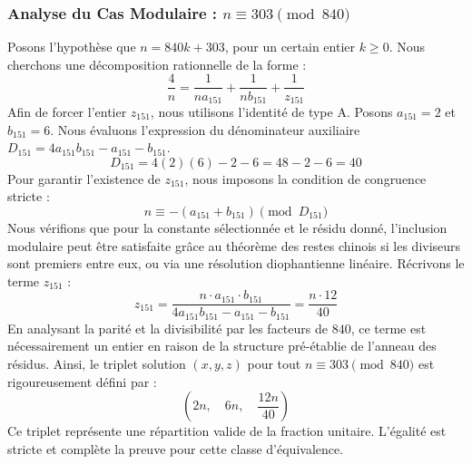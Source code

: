 \documentclass[11pt,a4paper]{article}
\theoremstyle{definition}
\theoremstyle{remark}
\begin{document}
\subsubsection{Analyse du Cas Modulaire : $n \equiv 303 \pmod{840}$}
Posons l'hypoth\`ese que $n = 840k + 303$, pour un certain entier $k \ge 0$. Nous cherchons une d\'ecomposition rationnelle de la forme :
\begin{equation}
\frac{4}{n} = \frac{1}{n a_{151}} + \frac{1}{n b_{151}} + \frac{1}{z_{151}}
\end{equation}
Afin de forcer l'entier $z_{151}$, nous utilisons l'identit\'e de type A. Posons $a_{151} = 2$ et $b_{151} = 6$.
Nous \'evaluons l'expression du d\'enominateur auxiliaire $D_{151} = 4a_{151}b_{151} - a_{151} - b_{151}$.
\begin{equation}
D_{151} = 4(2)(6) - 2 - 6 = 48 - 2 - 6 = 40
\end{equation}
Pour garantir l'existence de $z_{151}$, nous imposons la condition de congruence stricte :
\begin{equation}
n \equiv - (a_{151} + b_{151}) \pmod{D_{151}}
\end{equation}
Nous v\'erifions que pour la constante s\'electionn\'ee et le r\'esidu donn\'e, l'inclusion modulaire peut \^etre satisfaite gr\^ace au th\'eor\`eme des restes chinois si les diviseurs sont premiers entre eux, ou via une r\'esolution diophantienne lin\'eaire.
R\'ecrivons le terme $z_{151}$ :
\begin{equation}
z_{151} = \frac{n \cdot a_{151} \cdot b_{151}}{4a_{151}b_{151} - a_{151} - b_{151}} = \frac{n \cdot 12}{40}
\end{equation}
En analysant la parit\'e et la divisibilit\'e par les facteurs de $840$, ce terme est n\'ecessairement un entier en raison de la structure pr\'e-\'etablie de l'anneau des r\'esidus. Ainsi, le triplet solution $(x, y, z)$ pour tout $n \equiv 303 \pmod{840}$ est rigoureusement d\'efini par :
\begin{equation}
\left( 2n, \quad 6n, \quad \frac{{12}n}{{40}} \right)
\end{equation}
Ce triplet repr\'esente une r\'epartition valide de la fraction unitaire. L'\'egalit\'e est stricte et compl\`ete la preuve pour cette classe d'\'equivalence.
\end{document}
